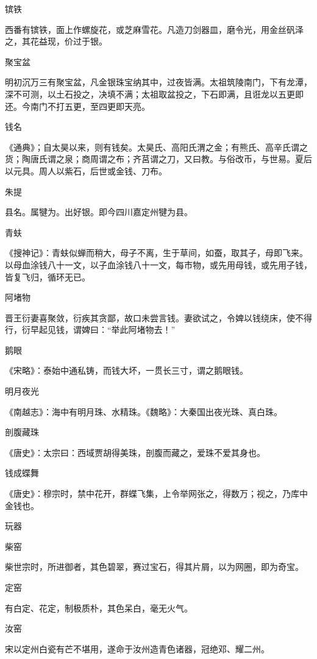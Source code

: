 \documentclass[a4paper,12pt,UTF8,twoside]{ctexbook}
\begin{document}
    镔铁
    
    西番有镔铁，面上作螺旋花，或芝麻雪花。凡造刀剑器皿，磨令光，用金丝矾泽之，其花益现，价过于银。
    
    聚宝盆
    
    明初沉万三有聚宝盆，凡金银珠宝纳其中，过夜皆满。太祖筑陵南门，下有龙潭，深不可测，以土石投之，决填不满；太祖取盆投之，下石即满，且诳龙以五更即还。今南门不打五更，至四更即天亮。
    
    钱名
    
    《通典》；自太昊以来，则有钱矣。太昊氏、高阳氏渭之金；有熊氏、高辛氏谓之货；陶唐氏谓之泉；商周谓之布；齐莒谓之刀，又曰教。与俗改币，与世易。夏后以元具。周人以紫石，后世或金钱、刀布。
    
    朱提
    
    县名。属犍为。出好银。即今四川嘉定州犍为县。
    
    青蚨
    
    《搜神记》：青蚨似蝉而稍大，母子不离，生于草间，如蚕，取其子，母即飞来。以母血涂钱八十一文，以子血涂钱八十一文，每市物，或先用母钱，或先用子钱，皆复飞归，循环无已。
    
    阿堵物
    
    晋王衍妻喜聚敛，衍疾其贪鄙，故口未尝言钱。妻欲试之，令婢以钱绕床，使不得行，衍早起见钱，谓婢曰：“举此阿堵物去！”
    
    鹅眼
    
    《宋略》：泰始中通私铸，而钱大坏，一贯长三寸，谓之鹅眼钱。
    
    明月夜光
    
    《南越志》：海中有明月珠、水精珠。《魏略》：大秦国出夜光珠、真白珠。
    
    剖腹藏珠
    
    《唐史》：太宗曰：西域贾胡得美珠，剖腹而藏之，爱珠不爱其身也。
    
    钱成蝶舞
    
    《唐史》：穆宗时，禁中花开，群蝶飞集，上令举网张之，得数万；视之，乃库中金钱也。
    
    玩器
    
    柴窑
    
    柴世宗时，所进御者，其色碧翠，赛过宝石，得其片屑，以为网圈，即为奇宝。
    
    定窑
    
    有白定、花定，制极质朴，其色呆白，毫无火气。
    
    汝窑
    
    宋以定州白瓷有芒不堪用，遂命于汝州造青色诸器，冠绝邓、耀二州。
    
\end{document}
